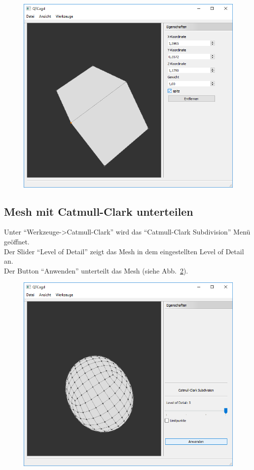 \begin{figure}[H]
	\centering
	\includegraphics[scale=0.5]{content/pictures/7-Punkte-KantenScharfSetzen}
	\caption{}
	\label{fig:Punkte-KantenScharfSetzen}
\end{figure}

\subsection{Mesh mit Catmull-Clark unterteilen}
Unter "`Werkzeuge->Catmull-Clark"' wird das "`Catmull-Clark Subdivision"' Menü geöffnet.\\
Der Slider "`Level of Detail"' zeigt das Mesh in dem eingestellten Level of Detail an.\\
Der Button "`Anwenden"' unterteilt das Mesh (siehe Abb.~\ref{fig:MeshCatmullClark}).

\begin{figure}[H]
	\centering
	\includegraphics[scale=0.5]{content/pictures/8-MeshCatmullClark}
	\caption{}
	\label{fig:MeshCatmullClark}
\end{figure}

